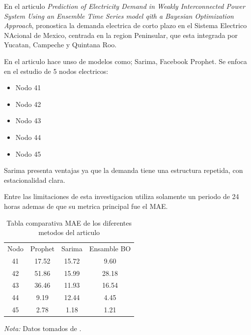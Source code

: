 En el articulo \textit{Prediction of Electricity Demand in Weakly Interconnected Power System Using an Ensemble Time Series model qith a Bayesian Optimization Approach}, pronostica la demanda electrica de corto plazo en el Sistema Electrico NAcional de Mexico, centrada en la region Peninsular, que esta integrada por Yucatan, Campeche y Quintana Roo.

En el articulo hace unso de modelos como; Sarima, Facebook Prophet.
Se enfoca en el estudio de 5 nodos electricos:
\begin{itemize}
    \item Nodo 41
    \item Nodo 42
    \item Nodo 43
    \item Nodo 44
    \item Nodo 45
\end{itemize}
Sarima presenta ventajas ya que la demanda tiene una estructura repetida, con estacionalidad clara.

Entre las limitaciones de esta investigacion utiliza solamente un periodo de 24 horas ademas de que su metrica principal fue el MAE.
\begin{table}[H]
    \centering
    \begin{tabular}{c|c|c|c}
    Nodo& Prophet & Sarima  & Ensamble BO \\
    41 & 17.52 & 15.72   & 9.60 \\
    42 & 51.86 & 15.99 & 28.18 \\
    43& 36.46 & 11.93 & 16.54 \\
    44& 9.19 & 12.44 & 4.45 \\
    45& 2.78 & 1.18 & 1.21 \\
    \end{tabular}
    \caption{Tabla comparativa MAE de los diferentes metodos del articulo }
    \label{tab:tablart1}
    {\raggedright \small \textit{Nota:} Datos tomados de \cite{PANALESPEREZ2025652}.\par}
\end{table}